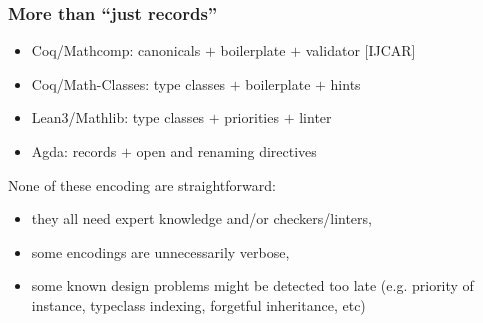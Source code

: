 \documentclass[11pt]{beamer}
\begin{document}
\begin{frame}
  \frametitle{More than ``just records''}



  \begin{itemize}
  \item {\sc Coq/Mathcomp}:     canonicals \alert<1>{$+$ boilerplate
      $+$ validator [IJCAR]}
  \item {\sc Coq/Math-Classes}: type classes \alert<1>{$+$ boilerplate $+$ hints}
  \item {\sc Lean3/Mathlib}:     type classes \alert<1>{$+$ priorities $+$ linter}
  \item {\sc Agda}:             records \alert<1>{$+$ open and renaming directives}
  \end{itemize}

  \vfill
  \pause
  \vfill

  None of these encoding are straightforward:
  \begin{itemize}
  \item they all need expert knowledge and/or checkers/linters,
  \item some encodings are unnecessarily verbose,
  \item some known design problems might be detected too late
    (e.g. priority of instance, typeclass indexing, forgetful
    inheritance, etc)
  \end{itemize}


  \vfill
  \pause
\end{frame}
\end{document}
